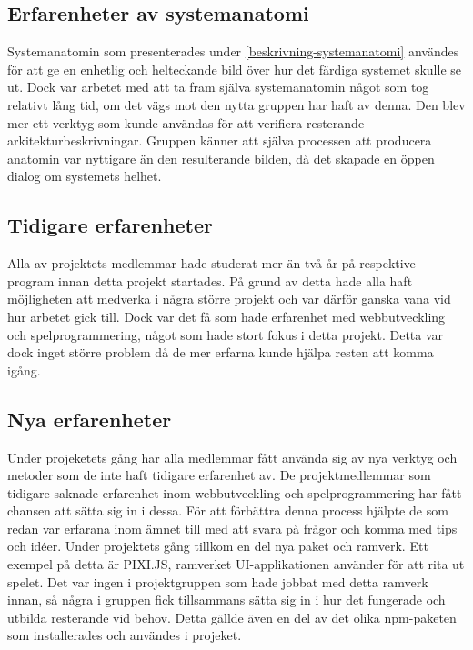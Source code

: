 \subsection{Erfarenheter av systemanatomi}
Systemanatomin som presenterades under \ref{beskrivning-systemanatomi} användes för att ge en enhetlig och helteckande bild över hur det färdiga systemet skulle se ut. Dock var arbetet med att ta fram själva systemanatomin något som tog relativt lång tid, om det vägs mot den nytta gruppen har haft av denna. Den blev mer ett verktyg som kunde användas för att verifiera resterande arkitekturbeskrivningar. Gruppen känner att själva processen att producera anatomin var nyttigare än den resulterande bilden, då det skapade en öppen dialog om systemets helhet.

\subsection{Tidigare erfarenheter}
Alla av projektets medlemmar hade studerat mer än två år på respektive program innan detta projekt startades. På grund av detta hade alla haft möjligheten att medverka i några större projekt och var därför ganska vana vid hur arbetet gick till. Dock var det få som hade erfarenhet med webbutveckling och spelprogrammering, något som hade stort fokus i detta projekt. Detta var dock inget större problem då de mer erfarna kunde hjälpa resten att komma igång.

\subsection{Nya erfarenheter}
Under projeketets gång har alla medlemmar fått använda sig av nya verktyg och metoder som de inte haft tidigare erfarenhet av. De projektmedlemmar som tidigare saknade erfarenhet inom webbutveckling och spelprogrammering har fått chansen att sätta sig in i dessa. För att förbättra denna process hjälpte de som redan var erfarana inom ämnet till med att svara på frågor och komma med tips och idéer. Under projektets gång tillkom en del nya paket och ramverk. Ett exempel på detta är PIXI.JS, ramverket UI-applikationen använder för att rita ut spelet. Det var ingen i projektgruppen som hade jobbat med detta ramverk innan, så några i gruppen fick tillsammans sätta sig in i hur det fungerade och utbilda resterande vid behov. Detta gällde även en del av det olika npm-paketen som installerades och användes i projeket.


